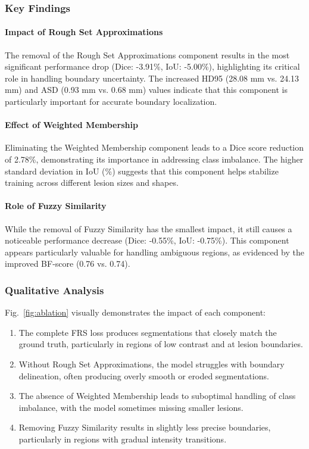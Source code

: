 \documentclass[review]{elsarticle}
\begin{document}
\subsubsection{Key Findings}

\paragraph{Impact of Rough Set Approximations}
The removal of the Rough Set Approximations component results in the most significant performance drop (Dice: -3.91\%, IoU: -5.00\%), highlighting its critical role in handling boundary uncertainty. The increased HD95 (28.08 mm vs. 24.13 mm) and ASD (0.93 mm vs. 0.68 mm) values indicate that this component is particularly important for accurate boundary localization.

\paragraph{Effect of Weighted Membership}
Eliminating the Weighted Membership component leads to a Dice score reduction of 2.78\%, demonstrating its importance in addressing class imbalance. The higher standard deviation in IoU (\%) suggests that this component helps stabilize training across different lesion sizes and shapes.

\paragraph{Role of Fuzzy Similarity}
While the removal of Fuzzy Similarity has the smallest impact, it still causes a noticeable performance decrease (Dice: -0.55\%, IoU: -0.75\%). This component appears particularly valuable for handling ambiguous regions, as evidenced by the improved BF-score (0.76 vs. 0.74).

\subsubsection{Qualitative Analysis}
Fig.~\ref{fig:ablation} visually demonstrates the impact of each component:
\begin{enumerate}
	\item The complete FRS loss produces segmentations that closely match the ground truth, particularly in regions of low contrast and at lesion boundaries.
	\item Without Rough Set Approximations, the model struggles with boundary delineation, often producing overly smooth or eroded segmentations.
	\item The absence of Weighted Membership leads to suboptimal handling of class imbalance, with the model sometimes missing smaller lesions.
	\item Removing Fuzzy Similarity results in slightly less precise boundaries, particularly in regions with gradual intensity transitions.
\end{enumerate}
\end{document}
